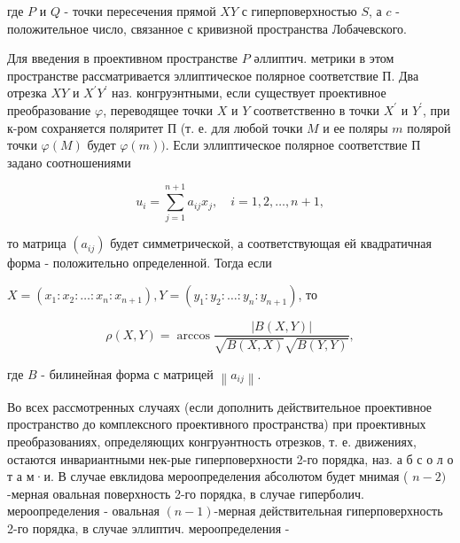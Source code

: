 \documentclass[10pt]{article}
\begin{document}
где $P$ и $Q$ - точки пересечения прямой $X Y$ с гиперповерхностью $S$, а $c$ - положительное число, связанное с кривизной пространства Лобачевского.



Для введения в проективном пространстве $P$ әллиптич. метрики в этом пространстве рассматривается эллиптическое полярное соответствие П. Два отрезка $X Y$ и $X^{\prime} Y^{\prime}$ наз. конгруэнтными, если существует проективное преобразование $\varphi$, переводящее точки $X$ и $Y$ соответственно в точки $X^{\prime}$ и $Y^{\prime}$, при к-ром сохраняется поляритет П (т. е. для любой точки $M$ и ее поляры $m$ полярой точки $\varphi(M)$ будет $\varphi(m))$. Если эллиптическое полярное соответствие П задано соотношениями



\[

u_{i}=\sum_{j=1}^{n+1} a_{i j} x_{j}, \quad i=1,2, \ldots, n+1,

\]



то матрица $\left(a_{i j}\right)$ будет симметрической, а соответствующая ей квадратичная форма - положительно определенной. Тогда если



$X=\left(x_{1}: x_{2}: \ldots: x_{n}: x_{n+1}\right), Y=\left(y_{1}: y_{2}: \ldots: y_{n}: y_{n+1}\right)$, то



\[

\rho(X, Y)=\arccos \frac{|B(X, Y)|}{\sqrt{B(X, X)} \sqrt{B(Y, Y)}},

\]



где $B$ - билинейная форма с матрицей $\left\|a_{i j}\right\|$.



Во всех рассмотренных случаях (если дополнить действительное проективное пространство до комплексного проективного пространства) при проективных преобразованиях, определяющих конгруәнтность отрезков, т. е. движениях, остаются инвариантными нек-рые гиперповерхности 2-го порядка, наз. а б с о л о т а м·и. В случае евклидова мероопределения абсолютом будет мнимая ( $n-2)$-мерная овальная поверхность 2-го порядка, в случае гиперболич. мероопределения - овальная $(n-1)$-мерная действительная гиперповерхность 2-го порядка, в случае эллиптич. мероопределения -
\end{document}
